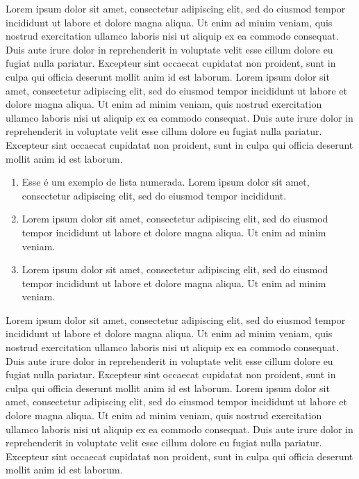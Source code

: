 \documentclass[portuguese]{sbc2025}%
\begin{document}
Lorem ipsum dolor sit amet, consectetur adipiscing elit, sed do eiusmod tempor incididunt ut labore et dolore magna aliqua. Ut enim ad minim veniam, quis nostrud exercitation ullamco laboris nisi ut aliquip ex ea commodo consequat. Duis aute irure dolor in reprehenderit in voluptate velit esse cillum dolore eu fugiat nulla pariatur. Excepteur sint occaecat cupidatat non proident, sunt in culpa qui officia deserunt mollit anim id est laborum. Lorem ipsum dolor sit amet, consectetur adipiscing elit, sed do eiusmod tempor incididunt ut labore et dolore magna aliqua. Ut enim ad minim veniam, quis nostrud exercitation ullamco laboris nisi ut aliquip ex ea commodo consequat. Duis aute irure dolor in reprehenderit in voluptate velit esse cillum dolore eu fugiat nulla pariatur. Excepteur sint occaecat cupidatat non proident, sunt in culpa qui officia deserunt mollit anim id est laborum.

\begin{enumerate}%
\item Esse é um exemplo de lista numerada. Lorem ipsum dolor sit amet, consectetur adipiscing elit, sed do eiusmod tempor incididunt.
\item Lorem ipsum dolor sit amet, consectetur adipiscing elit, sed do eiusmod tempor incididunt ut labore et dolore magna aliqua. Ut enim ad minim veniam.
\item Lorem ipsum dolor sit amet, consectetur adipiscing elit, sed do eiusmod tempor incididunt ut labore et dolore magna aliqua. Ut enim ad minim veniam.
\end{enumerate}

Lorem ipsum dolor sit amet, consectetur adipiscing elit, sed do eiusmod tempor incididunt ut labore et dolore magna aliqua. Ut enim ad minim veniam, quis nostrud exercitation ullamco laboris nisi ut aliquip ex ea commodo consequat. Duis aute irure dolor in reprehenderit in voluptate velit esse cillum dolore eu fugiat nulla pariatur. Excepteur sint occaecat cupidatat non proident, sunt in culpa qui officia deserunt mollit anim id est laborum. Lorem ipsum dolor sit amet, consectetur adipiscing elit, sed do eiusmod tempor incididunt ut labore et dolore magna aliqua. Ut enim ad minim veniam, quis nostrud exercitation ullamco laboris nisi ut aliquip ex ea commodo consequat. Duis aute irure dolor in reprehenderit in voluptate velit esse cillum dolore eu fugiat nulla pariatur. Excepteur sint occaecat cupidatat non proident, sunt in culpa qui officia deserunt mollit anim id est laborum.
\end{document}
